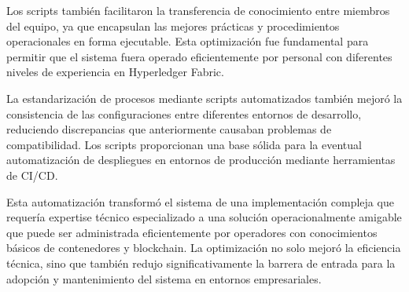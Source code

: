 Los scripts también facilitaron la transferencia de conocimiento entre miembros del equipo, ya que encapsulan las mejores prácticas y procedimientos operacionales en forma ejecutable. Esta optimización fue fundamental para permitir que el sistema fuera operado eficientemente por personal con diferentes niveles de experiencia en Hyperledger Fabric.

La estandarización de procesos mediante scripts automatizados también mejoró la consistencia de las configuraciones entre diferentes entornos de desarrollo, reduciendo discrepancias que anteriormente causaban problemas de compatibilidad. Los scripts proporcionan una base sólida para la eventual automatización de despliegues en entornos de producción mediante herramientas de CI/CD.

Esta automatización transformó el sistema de una implementación compleja que requería expertise técnico especializado a una solución operacionalmente amigable que puede ser administrada eficientemente por operadores con conocimientos básicos de contenedores y blockchain. La optimización no solo mejoró la eficiencia técnica, sino que también redujo significativamente la barrera de entrada para la adopción y mantenimiento del sistema en entornos empresariales.








